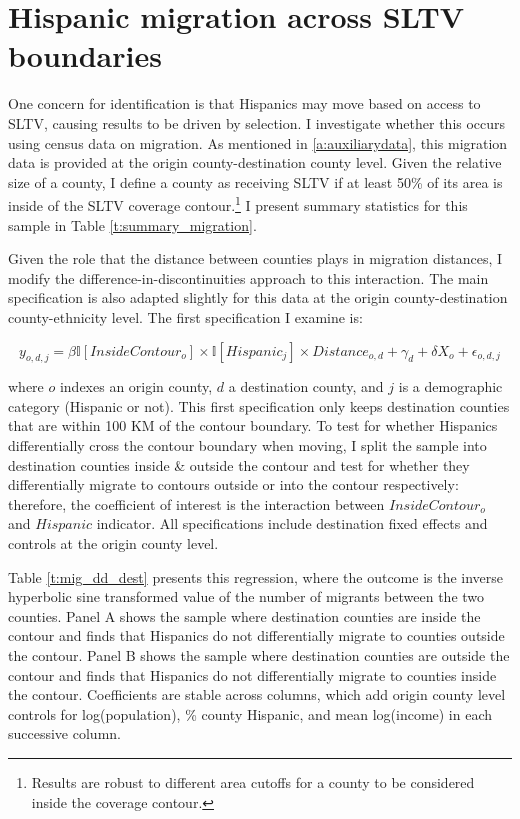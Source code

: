 \documentclass[11pt]{article}
\begin{document}
\clearpage

\section{Hispanic migration across SLTV boundaries}\label{a:migration}

One concern for identification is that Hispanics may move based on access to SLTV, causing results to be driven by selection. I investigate whether this occurs using census data on migration. As mentioned in \ref{a:auxiliarydata}, this migration data is provided at the origin county-destination county level. Given the relative size of a county, I define a county as receiving SLTV if at least 50\% of its area is inside of the SLTV coverage contour.\footnote{ Results are robust to different area cutoffs for a county to be considered inside the coverage contour.} I present summary statistics for this sample in Table \ref{t:summary_migration}.

Given the role that the distance between counties plays in migration distances, I modify the difference-in-discontinuities approach to this interaction. The main specification is also adapted slightly for this data at the origin county-destination county-ethnicity level. The first specification I examine is:

\[ y_{o,d,j} =  \beta \mathbb{I}[InsideContour_{o}] \times \mathbb{I}[Hispanic_{j}] \times Distance_{o,d} + \gamma_d + \delta  X_o + \epsilon_{o,d,j} \]

where $o$ indexes an origin county, $d$ a destination county, and $j$ is a demographic category (Hispanic or not). This first specification only keeps destination counties that are within 100 KM of the contour boundary. To test for whether Hispanics differentially cross the contour boundary when moving, I split the sample into destination counties inside \& outside the contour and test for whether they differentially migrate to contours outside or into the contour respectively: therefore, the coefficient of interest is the interaction between $InsideContour_o$ and $Hispanic$ indicator. All specifications include destination fixed effects and controls at the origin county level.

Table \ref{t:mig_dd_dest} presents this regression, where the outcome is the inverse hyperbolic sine transformed value of the number of migrants between the two counties. Panel A shows the sample where destination counties are inside the contour and finds that Hispanics do not differentially migrate to counties outside the contour. Panel B shows the sample where destination counties are outside the contour and finds that Hispanics do not differentially migrate to counties inside the contour. Coefficients are stable across columns, which add origin county level controls for log(population), \% county Hispanic, and mean log(income) in each successive column.
\end{document}
